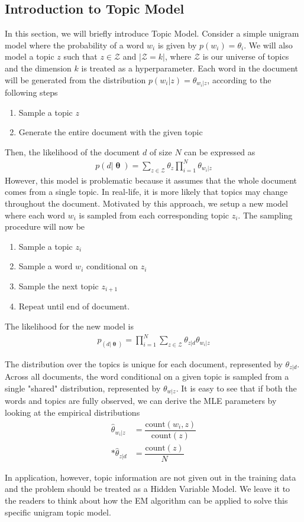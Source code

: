 \documentclass[justified, marginals=justified]{tufte-handout}
\theoremstyle{definition}
\begin{document}
\subsection{Introduction to Topic Model} 
In this section, we will briefly introduce Topic Model. Consider a simple unigram model where the probability of a word $w_i$ is given by $p(w_i)=\theta_i$. We will also model a topic $z$ such that $z\in\mathcal{Z}$ and $|\mathcal{Z}=k|$, where $\mathcal{Z}$ is our universe of topics and the dimension $k$ is treated as a hyperparameter. Each word in the document will be generated from the distribution $p(w_i|z) = \theta_{w_i|z}$, according to the following steps
\begin{enumerate}
	\item Sample a topic $z$
	\item Generate the entire document with the given topic
\end{enumerate}

Then, the likelihood of the document $d$ of size $N$ can be expressed as
\begin{align*}
p(d|\bm{\uptheta}) = \sum_{z\in\mathcal{Z}}\theta_z\prod_{i=1}^{N}\theta_{w_i|z}
\end{align*}
However, this model is problematic because it assumes that the whole document comes from a single topic. In real-life, it is more likely that topics may change throughout the document. Motivated by this approach, we setup a new model where each word $w_i$ is sampled from each corresponding topic $z_i$. The sampling procedure will now be
\begin{enumerate}
	\item Sample a topic $z_i$
	\item Sample a word $w_i$ conditional on $z_i$
	\item Sample the next topic $z_{i+1}$
	\item Repeat until end of document.
\end{enumerate}

The likelihood for the new model is
\begin{align*}
p_(d|\bm{\uptheta})=\prod_{i=1}^{N}\sum_{z\in\mathcal{Z}}\theta_{z|d}\theta_{w_i|z}
\end{align*}

The distribution over the topics is unique for each document, represented by $\theta_{z|d}$. Across all documents, the word conditional on a given topic is sampled from a single "shared" distribution, represented by $\theta_{w|z}$. It is easy to see that if both the words and topics are fully observed, we can derive the MLE parameters by looking at the empirical distributions
\begin{align*}
\hat{\theta}_{w_i|z} &= \dfrac{\text{count}(w_i,z)}{\text{count}(z)} \\*
\hat{\theta}_{z|d} &= \dfrac{\text{count}(z)}{N}
\end{align*}

In application, however, topic information are not given out in the training data and the problem should be treated as a Hidden Variable Model. We leave it to the readers to think about how the EM algorithm can be applied to solve this specific unigram topic model. 
\end{document}
